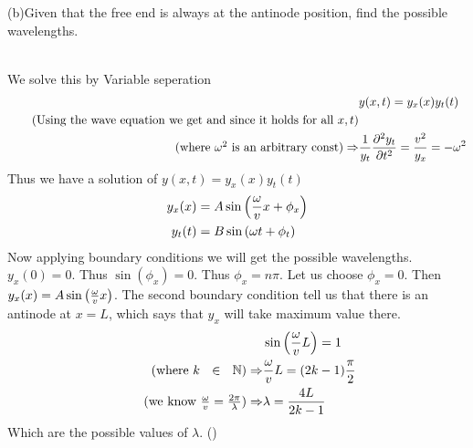 \documentclass[addpoints]{exam}
\begin{document}
\begin{questions}
(b)Given that the free end is always at the antinode position, find the possible wavelengths.
\begin{solution}\\
    We solve this by Variable seperation 
    \begin{align*}
        &y(x,t) = y_x(x)y_t(t) \\ 
        \tag{Using the wave equation we get and since it holds for all $x,t$}\\ 
        \tag{where $\omega^2$ is an arbitrary const}
    \Rightarrow& \frac{1}{y_t}\pdv[2]{y_t}{t} = \frac{v^2}{y_x} = -\omega^2
    \end{align*}
    Thus we have a solution of $y(x,t)=y_x(x)y_t(t)$
    \begin{align*}
        y_x(x) &= A\sin\qty(\frac{\omega}{v}x+\phi_x)\\ 
        y_t(t) &=B \sin\qty(\omega t+\phi_t)
    \end{align*}
    Now applying boundary conditions we will get the possible wavelengths. $y_x(0)=0$. Thus 
    $\sin(\phi_x) = 0 $. Thus $\phi_x = n\pi$. Let us choose $\phi_x = 0$. Then 
    $y_x(x) = A\sin\qty(\frac{\omega}{v}x)$. The second boundary condition tell us that there is 
    an antinode at $x=L$, which says that $y_x$ will take maximum value there.
    \begin{align*}
        &\sin\qty(\frac{\omega}{v}L) = 1 \\ 
        \tag{where $k~~ \in ~~\mathbb{N} $}
        \Rightarrow& \frac{\omega}{v}L = (2k-1)\frac{\pi}{2} \\ 
        \tag{we know $\frac{\omega}{v} = \frac{2\pi}{\lambda}$}
        \Rightarrow& \lambda = \frac{4L}{2k-1}
    \end{align*}
    Which are the possible values of $\lambda$.
    () 
\end{solution}

\end{questions}
\end{document}

